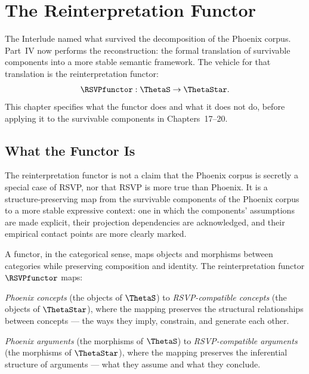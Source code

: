 
\chapter{The Reinterpretation Functor}
\label{ch:reinterpretation-functor}


\noindent
The Interlude named what survived the decomposition of the
Phoenix corpus. Part~IV now performs the reconstruction:
the formal translation of survivable components into a
more stable semantic framework. The vehicle for that
translation is the reinterpretation functor:
\[
  \RSVPfunctor : \ThetaS \to \ThetaStar.
\]
This chapter specifies what the functor does and what
it does not do, before applying it to the survivable
components in Chapters~17--20.

\section{What the Functor Is}
\label{sec:functor-definition}

The reinterpretation functor is not a claim that the
Phoenix corpus is secretly a special case of RSVP, nor
that RSVP is more true than Phoenix. It is a structure-preserving
map from the survivable components of the Phoenix corpus
to a more stable expressive context: one in which the
components' assumptions are made explicit, their projection
dependencies are acknowledged, and their empirical contact
points are more clearly marked.

A functor, in the categorical sense, maps objects and
morphisms between categories while preserving composition
and identity. The reinterpretation functor $\RSVPfunctor$
maps:

\textit{Phoenix concepts} (the objects of $\ThetaS$)
to \textit{RSVP-compatible concepts} (the objects of
$\ThetaStar$), where the mapping preserves the structural
relationships between concepts --- the ways they imply,
constrain, and generate each other.

\textit{Phoenix arguments} (the morphisms of $\ThetaS$)
to \textit{RSVP-compatible arguments} (the morphisms
of $\ThetaStar$), where the mapping preserves the
inferential structure of arguments --- what they assume
and what they conclude.

